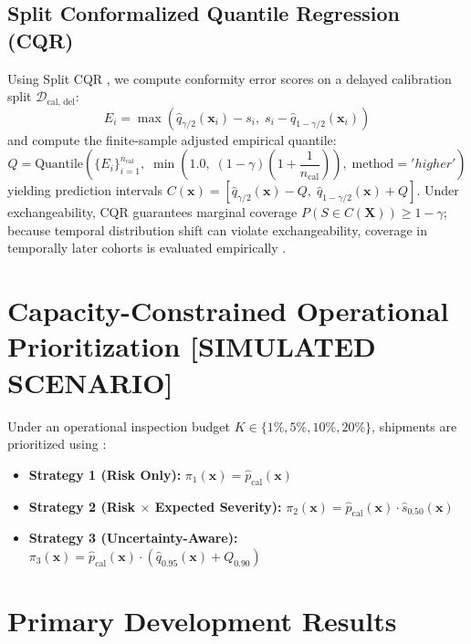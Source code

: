 \documentclass[11pt,a4paper]{article}
\begin{document}
\subsection{Split Conformalized Quantile Regression (CQR)}
Using Split CQR \cite{romano2019cqr}, we compute conformity error scores on a delayed calibration split $\mathcal{D}_{\text{cal, del}}$:
\begin{equation}
E_i = \max\left(\hat{q}_{\gamma/2}(\mathbf{x}_i) - s_i, \; s_i - \hat{q}_{1 - \gamma/2}(\mathbf{x}_i)\right)
\end{equation}
and compute the finite-sample adjusted empirical quantile:
\begin{equation}
Q = \text{Quantile}\left(\{E_i\}_{i=1}^{n_{\text{cal}}}, \; \min\left(1.0, \; (1 - \gamma)\left(1 + \frac{1}{n_{\text{cal}}}\right)\right), \; \text{method}='higher'\right)
\end{equation}
yielding prediction intervals $C(\mathbf{x}) = [\hat{q}_{\gamma/2}(\mathbf{x}) - Q, \; \hat{q}_{1 - \gamma/2}(\mathbf{x}) + Q]$. Under exchangeability, CQR guarantees marginal coverage $P(S \in C(\mathbf{X})) \ge 1 - \gamma$; because temporal distribution shift can violate exchangeability, coverage in temporally later cohorts is evaluated empirically \cite{barber2023beyond, gibbs2021adaptive}.

\section{Capacity-Constrained Operational Prioritization [SIMULATED SCENARIO]}
Under an operational inspection budget $K \in \{1\%, 5\%, 10\%, 20\%\}$, shipments are prioritized using \cite{bastani2021efficient}:
\begin{itemize}
    \item \textbf{Strategy 1 (Risk Only):} $\pi_1(\mathbf{x}) = \hat{p}_{\text{cal}}(\mathbf{x})$
    \item \textbf{Strategy 2 (Risk $\times$ Expected Severity):} $\pi_2(\mathbf{x}) = \hat{p}_{\text{cal}}(\mathbf{x}) \cdot \hat{s}_{0.50}(\mathbf{x})$
    \item \textbf{Strategy 3 (Uncertainty-Aware):} $\pi_3(\mathbf{x}) = \hat{p}_{\text{cal}}(\mathbf{x}) \cdot (\hat{q}_{0.95}(\mathbf{x}) + Q_{0.90})$
\end{itemize}

\section{Primary Development Results}
\end{document}
